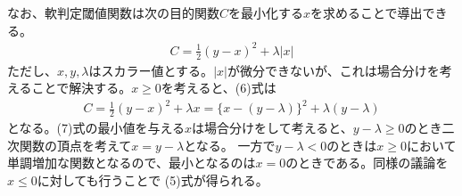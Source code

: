 \documentclass[letterpaper,10pt,english]{sphinxmanual}
\begin{document}
\begin{sphinxVerbatim}[commandchars=\\\{\}]
  
 
   
    
    

\end{sphinxVerbatim}

\noindent{}

なお、軟判定閾値関数は次の目的関数\(C\)を最小化する\(x\)を求めることで導出できる。
\begin{equation*}
\begin{split}
C=\frac{1}{2}(y-x)^2+\lambda |x|
\end{split}
\end{equation*}
ただし、\(x, y, \lambda\)はスカラー値とする。\(|x|\)が微分できないが、これは場合分けを考えることで解決する。\(x\geq 0\)を考えると、(6)式は
\begin{equation*}
\begin{split}
C=\frac{1}{2}(y-x)^2+\lambda x = \{x-(y-\lambda)\}^2+\lambda(y-\lambda)
\end{split}
\end{equation*}
となる。(7)式の最小値を与える\(x\)は場合分けをして考えると、\(y-\lambda\geq0\)のとき二次関数の頂点を考えて\(x=y-\lambda\)となる。 一方で\(y-\lambda<0\)のときは\(x\geq0\)において単調増加な関数となるので、最小となるのは\(x=0\)のときである。同様の議論を\(x\leq0\)に対しても行うことで (5)式が得られる。
\end{document}
